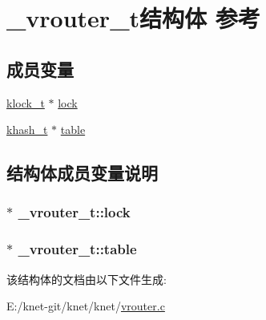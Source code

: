 \hypertarget{a00050}{}\section{\+\_\+vrouter\+\_\+t结构体 参考}
\label{a00050}
\subsection*{成员变量}
\begin{DoxyCompactItemize}
\item 
\hyperlink{a00066_a4c2f62ab63ab1fd49c71e52bbda0f393_a4c2f62ab63ab1fd49c71e52bbda0f393}{klock\+\_\+t} $\ast$ \hyperlink{a00050_a10ba7aef03e8ac7700961e9fc8a99523_a10ba7aef03e8ac7700961e9fc8a99523}{lock}
\item 
\hyperlink{a00066_aa242a9a673d8677076543d5768798f2c_aa242a9a673d8677076543d5768798f2c}{khash\+\_\+t} $\ast$ \hyperlink{a00050_a34f1df059625453cdc44c8df9b2eeeb6_a34f1df059625453cdc44c8df9b2eeeb6}{table}
\end{DoxyCompactItemize}


\subsection{结构体成员变量说明}
\hypertarget{a00050_a10ba7aef03e8ac7700961e9fc8a99523_a10ba7aef03e8ac7700961e9fc8a99523}{}
\subsubsection[{lock}]{$\ast$ \+\_\+vrouter\+\_\+t\+::lock}\label{a00050_a10ba7aef03e8ac7700961e9fc8a99523_a10ba7aef03e8ac7700961e9fc8a99523}
\hypertarget{a00050_a34f1df059625453cdc44c8df9b2eeeb6_a34f1df059625453cdc44c8df9b2eeeb6}{}
\subsubsection[{table}]{$\ast$ \+\_\+vrouter\+\_\+t\+::table}\label{a00050_a34f1df059625453cdc44c8df9b2eeeb6_a34f1df059625453cdc44c8df9b2eeeb6}


该结构体的文档由以下文件生成\+:\begin{DoxyCompactItemize}
\item 
E\+:/knet-\/git/knet/knet/\hyperlink{a00125}{vrouter.\+c}\end{DoxyCompactItemize}
